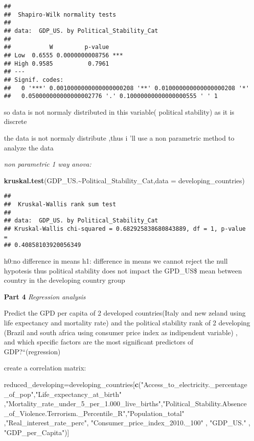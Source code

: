 \documentclass[
]{article}
\newenvironment{Shaded}{\begin{snugshade}}{\end{snugshade}}
\newcommand{\AttributeTok}[1]{\textcolor[rgb]{0.13,0.29,0.53}{#1}}
\newcommand{\FunctionTok}[1]{\textcolor[rgb]{0.13,0.29,0.53}{\textbf{#1}}}
\newcommand{\NormalTok}[1]{#1}
\newcommand{\OtherTok}[1]{\textcolor[rgb]{0.56,0.35,0.01}{#1}}
\newcommand{\SpecialCharTok}[1]{\textcolor[rgb]{0.81,0.36,0.00}{\textbf{#1}}}
\newcommand{\StringTok}[1]{\textcolor[rgb]{0.31,0.60,0.02}{#1}}
\begin{document}
\begin{verbatim}
## 
##  Shapiro-Wilk normality tests
## 
## data:  GDP_US. by Political_Stability_Cat 
## 
##           W         p-value    
## Low  0.6555 0.0000000008756 ***
## High 0.9585          0.7961    
## ---
## Signif. codes:  
##   0 '***' 0.0010000000000000000208 '**' 0.010000000000000000208 '*'
##   0.050000000000000002776 '.' 0.10000000000000000555 ' ' 1
\end{verbatim}

so data is not normaly distributed in this variable( political
stability) as it is discrete

the data is not normaly distribute ,thus i 'll use a non parametric
method to analyze the data

\emph{non parametric 1 way anova:}

\begin{Shaded}
\begin{Highlighting}[]
\FunctionTok{kruskal.test}\NormalTok{(GDP\_US.}\SpecialCharTok{\textasciitilde{}}\NormalTok{Political\_Stability\_Cat,}\AttributeTok{data =}\NormalTok{ developing\_countries)}
\end{Highlighting}
\end{Shaded}

\begin{verbatim}
## 
##  Kruskal-Wallis rank sum test
## 
## data:  GDP_US. by Political_Stability_Cat
## Kruskal-Wallis chi-squared = 0.682925838680843889, df = 1, p-value =
## 0.40858103920056349
\end{verbatim}

h0:no difference in means h1: difference in means we cannot reject the
null hypotesis thus political stability does not impact the GPD\_US\$
mean between country in the developing country group

\textbf{Part 4} \emph{Regression analysis}

Predict the GPD per capita of 2 developed countries(Italy and new zeland
using life expectancy and mortality rate) and the political stability
rank of 2 developing (Brazil and south africa using consumer price index
as indipendent variable) , and which specific factors are the most
significant predictors of GDP?{}``(regression)

create a correlation matrix:

\begin{Shaded}
\begin{Highlighting}[]
\NormalTok{reduced\_developing}\OtherTok{=}\NormalTok{developing\_countries[}\FunctionTok{c}\NormalTok{(}\StringTok{"Access\_to\_electricity.\_percentage\_of\_pop"}\NormalTok{,}\StringTok{"Life\_expectancy\_at\_birth"}\NormalTok{  ,}\StringTok{"Mortality\_rate\_under\_5\_per\_1.000\_live\_births"}\NormalTok{,}\StringTok{"Political\_Stability.Absence\_of\_Violence.Terrorism.\_Percentile\_R"}\NormalTok{,}\StringTok{"Population\_total"}\NormalTok{ ,}\StringTok{"Real\_interest\_rate\_perc"}\NormalTok{, }\StringTok{"Consumer\_price\_index\_2010.\_100"}\NormalTok{ , }\StringTok{"GDP\_US."}\NormalTok{ , }\StringTok{"GDP\_per\_Capita"}\NormalTok{)]}
\end{Highlighting}
\end{Shaded}
\end{document}
